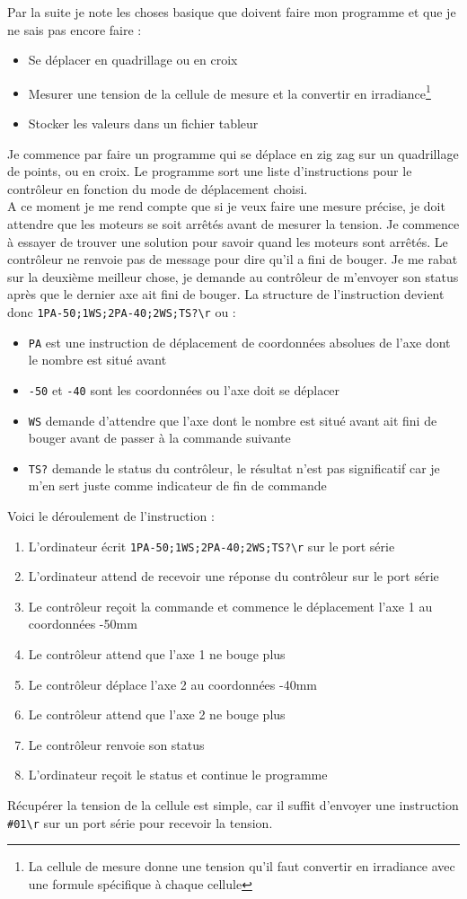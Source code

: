 \documentclass[12pt]{article}
\begin{document}
Par la suite je note les choses basique que doivent faire mon programme et que je ne sais pas encore faire :
\begin{itemize}
	\item Se déplacer en quadrillage ou en croix
	\item Mesurer une tension de la cellule de mesure et la convertir en irradiance\footnote{La cellule de mesure donne une tension qu'il faut convertir en irradiance avec une formule spécifique à chaque cellule}
	\item Stocker les valeurs dans un fichier tableur
\end{itemize}
Je commence par faire un programme qui se déplace en zig zag sur un quadrillage de points, ou en croix.
Le programme sort une liste d'instructions pour le contrôleur en fonction du mode de déplacement choisi.\\
A ce moment je me rend compte que si je veux faire une mesure précise, je doit attendre que les moteurs se soit arrêtés avant de mesurer la tension.
Je commence à essayer de trouver une solution pour savoir quand les moteurs sont arrêtés.
Le contrôleur ne renvoie pas de message pour dire qu'il a fini de bouger.
Je me rabat sur la deuxième meilleur chose, je demande au contrôleur de m'envoyer son status après que le dernier axe ait fini de bouger.
La structure de l'instruction devient donc \verb|1PA-50;1WS;2PA-40;2WS;TS?\r| ou :
\begin{itemize}
	\item \verb|PA| est une instruction de déplacement de coordonnées absolues de l'axe dont le nombre est situé avant
	\item \verb|-50| et \verb|-40| sont les coordonnées ou l'axe doit se déplacer
	\item \verb|WS| demande d'attendre que l'axe dont le nombre est situé avant ait fini de bouger avant de passer à la commande suivante
	\item \verb|TS?| demande le status du contrôleur, le résultat n'est pas significatif car je m'en sert juste comme indicateur de fin de commande
\end{itemize}
Voici le déroulement de l'instruction :
\begin{enumerate}
	\item L'ordinateur écrit \verb|1PA-50;1WS;2PA-40;2WS;TS?\r| sur le port série
	\item L'ordinateur attend de recevoir une réponse du contrôleur sur le port série
	\item Le contrôleur reçoit la commande et commence le déplacement l'axe 1 au coordonnées -50mm
	\item Le contrôleur attend que l'axe 1 ne bouge plus
	\item Le contrôleur déplace l'axe 2 au coordonnées -40mm
	\item Le contrôleur attend que l'axe 2 ne bouge plus
	\item Le contrôleur renvoie son status
	\item L'ordinateur reçoit le status et continue le programme
\end{enumerate}
Récupérer la tension de la cellule est simple, car il suffit d'envoyer une instruction \verb|#01\r| sur un port série pour recevoir la tension.
\end{document}
